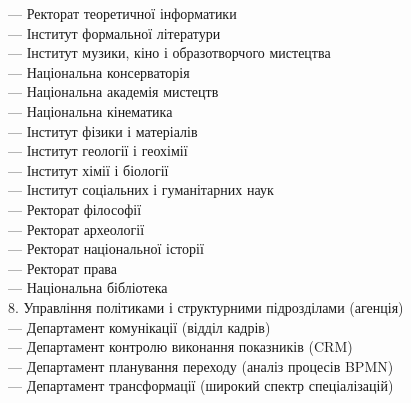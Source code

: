 \hspace*{0.7cm}         — Ректорат теоретичної інформатики \\
\hspace*{0.25cm}     — Інститут формальної літератури \\
\hspace*{0.25cm}     — Інститут музики, кіно і образотворчого мистецтва \\
\hspace*{0.7cm}         — Національна консерваторія \\
\hspace*{0.7cm}         — Національна академія мистецтв \\
\hspace*{0.7cm}         — Національна кінематика \\
\hspace*{0.25cm}     — Інститут фізики і матеріалів \\
\hspace*{0.25cm}     — Інститут геології і геохімії \\
\hspace*{0.25cm}     — Інститут хімії і біології \\
\hspace*{0.25cm}     — Інститут соціальних і гуманітарних наук \\
\hspace*{0.7cm}         — Ректорат філософії \\
\hspace*{0.7cm}         — Ректорат археології \\
\hspace*{0.7cm}         — Ректорат національної історії \\
\hspace*{0.7cm}         — Ректорат права \\
\hspace*{0.7cm}         — Національна бібліотека \\
8. Управління політиками і структурними підрозділами (агенція) \\
\hspace*{0.25cm}     — Департамент комунікації (відділ кадрів) \\
\hspace*{0.25cm}     — Департамент контролю виконання показників (CRM) \\
\hspace*{0.25cm}     — Департамент планування переходу (аналіз процесів BPMN) \\
\hspace*{0.25cm}     — Департамент трансформації (широкий спектр спеціалізацій) \\

